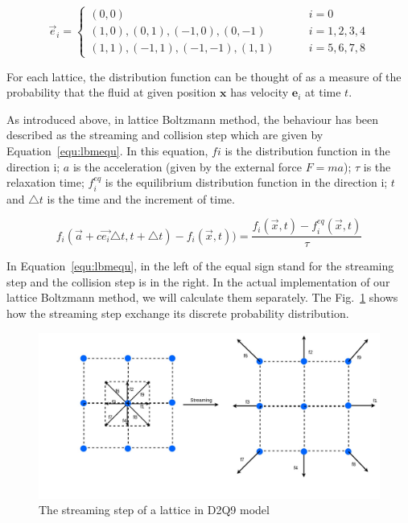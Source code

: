 \begin{equation}
\label{equ:d2q9}
    \overrightarrow{e}_{i} = \left\{\begin{matrix}
(0,0) \qquad\qquad\qquad\qquad\qquad\qquad &i=0 \\ 
(1,0), (0,1), (-1,0), (0,-1)\quad\qquad &i=1,2,3,4 \\ 
(1,1), (-1,1), (-1,-1), (1,1)\qquad & i=5,6,7,8
\end{matrix}\right.
\end{equation}

For each lattice, the distribution function can be thought of as a measure of the probability that the fluid at given position $\mathbf{x}$ has velocity $\mathbf{e}_i$ at time $t$.

As introduced above, in lattice Boltzmann method, the behaviour has been described as the streaming and collision step which are given by Equation~\ref{equ:lbmequ}. In this equation, $fi$ is the distribution function in the direction i; $a$ is the acceleration (given by the external force $F=ma$); $\tau$ is the relaxation time; $f_i^{eq}$ is the equilibrium distribution function in the direction i; $t$ and $\triangle t$ is the time and the increment of time.

\begin{equation}
\label{equ:lbmequ}
f_i(\vec{a}+c\vec{e_i}\triangle t, t+\triangle t) - f_i(\vec x,t)) = \frac{f_i(\vec x, t) - f_i^{eq}(\vec x , t)}{\tau}
\end{equation}




In Equation~\ref{equ:lbmequ}, in the left of the equal sign stand for the streaming step and the collision step is in the right. In the actual implementation of our lattice Boltzmann method, we will calculate them separately. The Fig.~\ref{fig:stream} shows how the streaming step exchange its discrete probability distribution.


\begin{figure}[!tb]
   \centering
       \includegraphics[width=1\textwidth]{figures/stream.jpg}
       \caption{The streaming step of a lattice in D2Q9 model}
       \label{fig:stream}
\end{figure}

